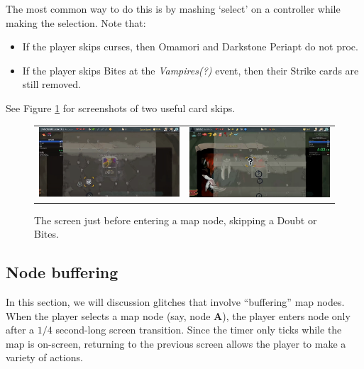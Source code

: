 \documentclass[12pt]{amsart}
\begin{document}
The most common way to do this is by mashing `select' on a controller while making the selection.  
Note that: 
\begin{itemize}
    \item 
        If the player skips curses, then  Omamori and Darkstone Periapt do not proc.  
    \item 
        If the player skips Bites at the \textit{Vampires(?)} event, then their Strike cards are still removed.  
\end{itemize}
See Figure \ref{fig: card skips} for screenshots of two useful card skips.  
\begin{figure}[h]
    \centering
    \begin{tabular}{c|c}
        \includegraphics[scale=.3]{graphics/CurseSkip.png}
        & \includegraphics[scale=.3]{graphics/BitesSkip.png}
    \end{tabular}
    \caption{The screen just before entering a map node, skipping a Doubt or Bites.  }
    \label{fig: card skips}
\end{figure}
\subsection{Node buffering}\label{sub-sec: node buffering}
In this section, we will discussion glitches that involve ``buffering'' map nodes.  
When the player selects a map node (say, node \textbf{A}), the player enters node  only after a $1/4$ second-long screen transition.  
Since the timer only ticks while the map is on-screen, returning to the previous screen allows the player to make a variety of actions.  
\\
\end{document}
